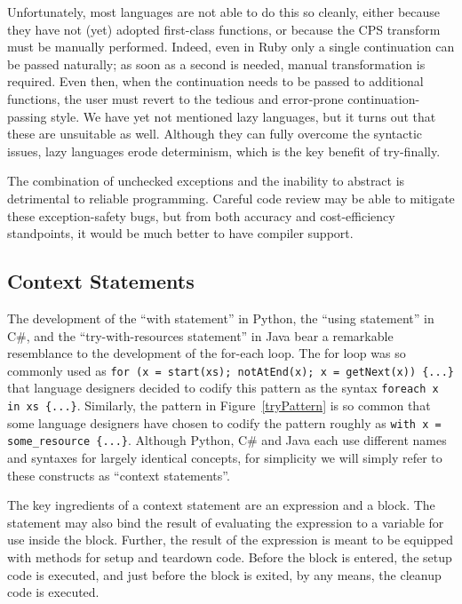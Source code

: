 \documentclass[11pt]{article}
\newcommand{\maybePage}{\newpage}
\begin{document}
Unfortunately, most languages are not able to do this so cleanly, either because they have not (yet) adopted first-class functions, or because the CPS transform must be manually performed.
Indeed, even in Ruby only a single continuation can be passed naturally; as soon as a second is needed, manual transformation is required.
Even then, when the continuation needs to be passed to additional functions, the user must revert to the tedious and error-prone continuation-passing style.
We have yet not mentioned lazy languages, but it turns out that these are unsuitable as well.
Although they can fully overcome the syntactic issues, lazy languages erode determinism, which is the key benefit of try-finally.

The combination of unchecked exceptions and the inability to abstract is detrimental to reliable programming.
Careful code review may be able to mitigate these exception-safety bugs, but from both accuracy and cost-efficiency standpoints, it would be much better to have compiler support.


\maybePage
\subsection{Context Statements}
\label{context statements}

The development of the ``with statement'' in Python, the ``using statement'' in C\#, and the ``try-with-resources statement'' in Java bear a remarkable resemblance to the development of the for-each loop.
The for loop was so commonly used as \texttt{for (x = start(xs); notAtEnd(x); x = getNext(x)) \{...\}} that language designers decided to codify this pattern as the syntax \texttt{foreach x in xs \{...\}}.
Similarly, the pattern in Figure~\ref{tryPattern} is so common that some language designers have chosen to codify the pattern roughly as \texttt{with x = some\_resource \{...\}}.
Although Python, C\# and Java each use different names and syntaxes for largely identical concepts, for simplicity we will simply refer to these constructs as ``context statements''.

The key ingredients of a context statement are an expression and a block.
The statement may also bind the result of evaluating the expression to a variable for use inside the block.
Further, the result of the expression is meant to be equipped with methods for setup and teardown code.
Before the block is entered, the setup code is executed, and just before the block is exited, by any means, the cleanup code is executed.\cite{JavaStandard}\cite{PEP343}\cite{cSharpStandard}
\end{document}
